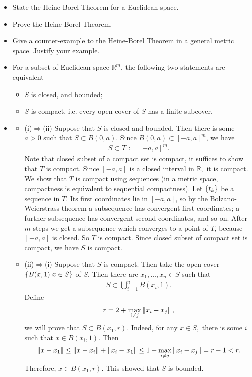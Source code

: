 \begin{problem}
\begin{itemize}
    \item[(a)] State the Heine-Borel Theorem for a Euclidean space.
    \item[(b)] Prove the Heine-Borel Theorem.
    \item[(c)] Give a counter-example to the Heine-Borel Theorem in a general metric space. Justify your example.
\end{itemize}
\begin{solution}
\begin{itemize}
    \item[(a)] For a subset of Euclidean space $\mathbb{R}^m$, the following two statements are equivalent
    \begin{itemize}
        \item[(i)] $S$ is closed, and bounded;
        \item[(ii)] $S$ is compact, i.e. every open cover of $S$ has a finite subcover.
    \end{itemize}
    \item[(b)] \begin{itemize}
        \item[](i)$\Rightarrow$(ii) \quad Suppose that $S$ is closed and bounded. Then there is some $a>0$ such that $S\subset B(0,a)$. Since  $ B(0,a)\subset [-a,a]^m$, we have
        \begin{align*}
            S\subset T:=[-a,a]^m.
        \end{align*}
        Note that closed subset of a compact set is compact, it suffices to show that $T$ is compact. Since $[-a,a]$ is a closed interval in $\mathbb{R},$ it is compact. We show that $T$ is compact using sequences (in a metric space, compactness is equivalent to sequential compactness). Let $\left\{ t_k\right\}$ be a sequence in $T$. Its first coordinates lie in $[-a,a]$, so by the Bolzano-Weierstrass theorem a subsequence has convergent first coordinates; a further subsequence has convergent second coordinates, and so on. After $m$ steps we get a subsequence which converges to a point of $T$, because $[-a,a]$ is closed. So $T$ is compact. Since closed subset of compact set is compact, we have $S$ is compact.
        \item[](ii)$\Rightarrow$(i) Suppose that $S$ is compact. Then take the open cover $\left\{ B(x,1)|x\in S\right\}$ of $S.$ Then there are $x_1,\ldots,x_n\in S$ such that \begin{align*}
            S\subset \bigcup_{i=1}^nB(x_i,1).
        \end{align*}
        Define 
        \begin{align*}
            r=2+\max_{i\ne j}\left\lVert x_i-x_j\right\rVert,
        \end{align*}
        we will prove that $S\subset B(x_1,r).$ Indeed, for any $x\in S,$ there is some $i$ such that $x\in B(x_i,1).$ Then 
        \begin{align*}
        \left\lVert x-x_1\right\rVert\le \left\lVert x-x_i\right\rVert+\left\lVert x_i-x_1\right\rVert\le 1+\max_{i\ne j}\left\lVert x_i-x_j\right\rVert=r-1<r.
        \end{align*}
        Therefore, $x\in B(x_1,r).$ This showed that $S$ is bounded. 
        

\end{itemize}
\end{itemize}
\end{solution}
\end{problem}
